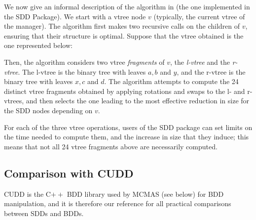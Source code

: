 \documentclass[11pt]{report}
\begin{document}
We now give an informal description of the algorithm in \cite{sdd_3} (the one implemented in the SDD Package). We start with a vtree node $v$ (typically, the current vtree of the manager). The algorithm first makes two recursive calls on the children of $v$, ensuring that their structure is optimal. Suppose that the vtree obtained is the one represented below:



Then, the algorithm considers two vtree \textit{fragments} of $v$, the \textit{l-vtree} and the \textit{r-vtree}. The l-vtree is the binary tree with leaves $a, b$ and $y$, and the r-vtree is the binary tree with leaves $x, c$ and $d$. The algorithm attempts to compute the 24 distinct vtree fragments obtained by applying rotations and swaps to the l- and r-vtrees, and then selects the one leading to the most effective reduction in size for the SDD nodes depending on $v$. 


For each of the three vtree operations, users of the SDD package can set limits on the time needed to compute them, and the increase in size that they induce; this means that not all 24 vtree fragments above are necessarily computed. 

\subsection{Comparison with CUDD}
\label{comparison_with_cudd}

CUDD is the C$++$ BDD library used by MCMAS (see below) for BDD manipulation, and it is therefore our reference for all practical comparisons between SDDs and BDDs. 
\end{document}
